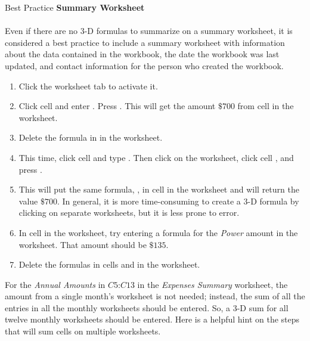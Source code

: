 \begin{center}
	\begin{infobox}{Best Practice}
		\textbf{Summary Worksheet}
		\\
		\\
		Even if there are no $ 3 $-D formulas to summarize on a summary worksheet, it is considered a best practice to include a summary worksheet with information about the data contained in the workbook, the date the workbook was last updated, and contact information for the person who created the workbook.
	\end{infobox}
\end{center}

\begin{enumerate}
	\item Click the  worksheet tab to activate it.
	\item Click cell  and enter . Press . This will get the amount $ \$700 $ from cell  in the  worksheet.
	\item Delete the formula in  in the  worksheet.
	\item This time, click cell  and type \fmtTyping{=}. Then click on the  worksheet, click cell , and press .
	\item This will put the same formula, , in cell  in the  worksheet and will return the value $ \$700 $. In general, it is more time-consuming to create a $ 3 $-D formula by clicking on separate worksheets, but it is less prone to error.
	\item In cell  in the  worksheet, try entering a formula for the \textit{Power} amount in the  worksheet. That amount should be $ \$135 $.
	\item Delete the formulas in cells  and  in the  worksheet.
\end{enumerate}

For the \textit{Annual Amounts} in $ C5 $:$ C13 $ in the \textit{Expenses Summary} worksheet, the amount from a single month's worksheet is not needed; instead, the sum of all the entries in all the monthly worksheets should be entered. So, a $ 3 $-D sum for all twelve monthly worksheets should be entered. Here is a helpful hint on the steps that will sum cells on multiple worksheets.

